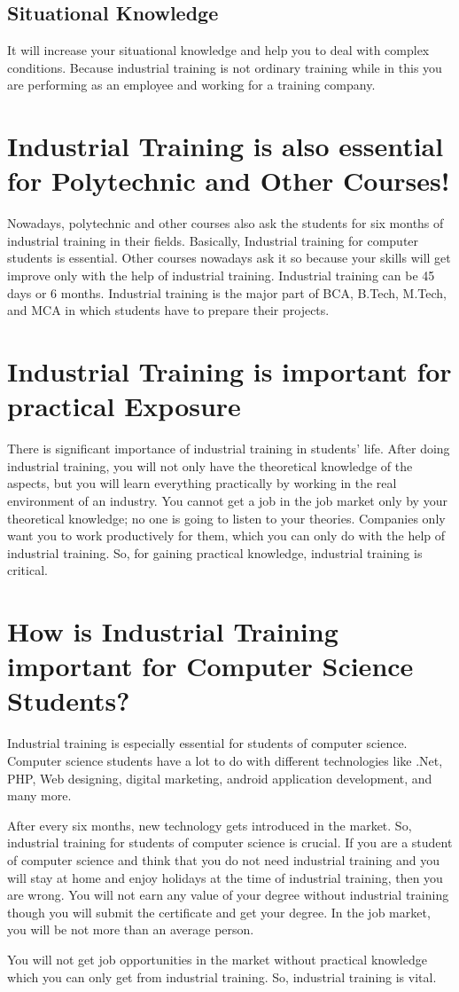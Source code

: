 \documentclass[12pt]{article}
\begin{document}
\subsection{Situational Knowledge}
It will increase your situational knowledge and help you to deal with complex conditions. Because industrial training is not ordinary training while in this you are performing as an employee and working for a training company.

\section{Industrial Training is also essential for Polytechnic and Other Courses!}
Nowadays, polytechnic and other courses also ask the students for six months of industrial training in their fields. Basically, Industrial training for computer students is essential. Other courses nowadays ask it so because your skills will get improve only with the help of industrial training. Industrial training can be 45 days or 6 months. Industrial training is the major part of BCA, B.Tech, M.Tech, and MCA in which students have to prepare their projects.

\section{Industrial Training is important for practical Exposure}
There is significant importance of industrial training in students’ life.  After doing industrial training, you will not only have the theoretical knowledge of the aspects, but you will learn everything practically by working in the real environment of an industry. You cannot get a job in the job market only by your theoretical knowledge; no one is going to listen to your theories. Companies only want you to work productively for them, which you can only do with the help of industrial training. So, for gaining practical knowledge, industrial training is critical.

\section{How is Industrial Training important for Computer Science Students?}
Industrial training is especially essential for students of computer science. Computer science students have a lot to do with different technologies like .Net, PHP, Web designing, digital marketing, android application development, and many more.

After every six months, new technology gets introduced in the market. So, industrial training for students of computer science is crucial. If you are a student of computer science and think that you do not need industrial training and you will stay at home and enjoy holidays at the time of industrial training, then you are wrong. You will not earn any value of your degree without industrial training though you will submit the certificate and get your degree. In the job market, you will be not more than an average person.

You will not get job opportunities in the market without practical knowledge which you can only get from industrial training. So, industrial training is vital.
\end{document}
